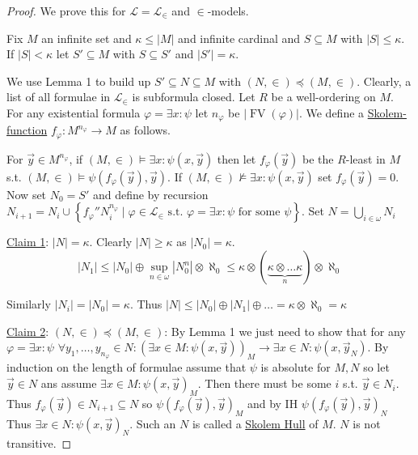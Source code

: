 \documentclass{scrartcl}
\renewcommand{\L}{\mathcal{L}}
\newcommand{\Le}{\L_\in}
\newcommand{\set}[1]{\left\{#1\right\}}
\DeclareMathOperator{\FV}{FV}
\theoremstyle{definition}
\theoremstyle{plain}
\theoremstyle{remark}
\begin{document}
	\begin{proof}
		We prove this for $\L = \Le$ and $\in$-models.
		
		Fix $M$ an infinite set and $\kappa \leq |M|$ and infinite cardinal and $S \subseteq M$ with $|S| \leq \kappa$. If $|S| < \kappa$ let $S' \subseteq M$ with $S \subseteq S'$ and $|S'| = \kappa$.
		
		We use Lemma 1 to build up $S' \subseteq N \subseteq M$ with $(N, \in) \preceq (M, \in )$. Clearly, a list of all formulae in $\Le$ is subformula closed. Let $R$ be a well-ordering on $M$. For any existential formula $\varphi = \exists x: \psi$ let $n_\varphi$ be $|\FV(\varphi)|$. We define a \underline{Skolem-function} $f_\varphi: M^{n_\varphi} \to M$ as follows.
		
		For $\vec{y} \in M^{n_\varphi}$, if $(M, \in) \vDash \exists x: \psi(x, \vec{y})$ then let $f_\varphi(\vec{y})$ be the $R$-least in $M$ s.t. $(M, \in) \vDash \psi(f_\varphi(\vec{y}), \vec{y})$. If 
		$(M, \in) \nvDash \exists x: \psi(x, \vec{y})$ set $f_\varphi(\vec{y}) = 0$. Now set $N_0 = S'$ and define by recursion $N_{i+1} = N_i \cup \set{f_\varphi '' N_i^{n_\varphi} \mid \varphi \in \Le \text{ s.t. } \varphi = \exists x: \psi \text{ for some } \psi}$. Set $N = \bigcup_{i \in \omega} N_i$
		
		\underline{Claim 1}: $|N| = \kappa$. Clearly $|N| \geq \kappa$ as $|N_0| = \kappa$.
		\[|N_1| \leq |N_0| \oplus \sup_{n\in \omega} |N_0^n| \otimes \aleph_0 \leq \kappa \otimes (\underbrace{\kappa \otimes \dots \kappa}_{n}) \otimes \aleph_0\]
		
		Similarly $|N_i| = |N_0| = \kappa$. Thus $|N| \leq |N_0| \oplus |N_1| \oplus \dots = \kappa \otimes \aleph_0 = \kappa$
		
		\underline{Claim 2}: $(N, \in) \preceq (M, \in)$: By Lemma 1 we just need to show that for any $\varphi = \exists x: \psi$ $\forall y_1, \dots, y_{n_\varphi} \in N: (\exists x \in M: \psi(x, \vec{y}))_M \longrightarrow \exists x \in N: \psi(x, \vec{y}_N)$. By induction on the length of formulae assume that $\psi$ is absolute for $M, N$ so let $\vec{y} \in N$ ans assume $\exists x \in M: \psi(x, \vec{y})_M$. Then there must be some $i$ s.t. $\vec{y} \in N_i$. Thus $f_\varphi(\vec{y}) \in N_{i+1} \subseteq N$ so $\psi(f_\varphi(\vec{y}), \vec{y})_M$ and by IH $\psi(f_\varphi(\vec{y}), \vec{y})_N$ Thus $\exists x \in N: \psi(x, \vec{y})_N$. Such an $N$ is called a \underline{Skolem Hull} of $M$. $N$ is not transitive.
	\end{proof}
	
\end{document}
